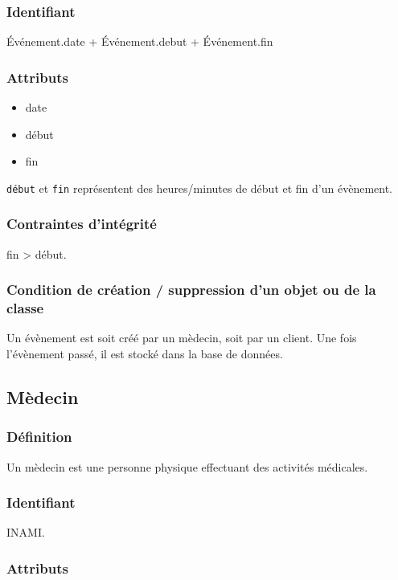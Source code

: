 \documentclass[a4paper, 11pt]{report}
\begin{document}
\subsubsection{Identifiant}

Événement.date + Événement.debut + Événement.fin

\subsubsection{Attributs}

\begin{itemize}
    \item date
    \item début
    \item fin
\end{itemize}

\texttt{début} et \texttt{fin} représentent des heures/minutes de début et fin d'un évènement.

\subsubsection{Contraintes d'intégrité}

fin > début.

\subsubsection{Condition de création / suppression d'un objet ou de la classe}

Un évènement est soit créé par un mèdecin, soit par un client. Une fois l'évènement passé,
il est stocké dans la base de données.

\subsection{Mèdecin}

\subsubsection{Définition}

Un mèdecin est une personne physique effectuant des activités médicales.

\subsubsection{Identifiant}

INAMI.

\subsubsection{Attributs}
\end{document}
